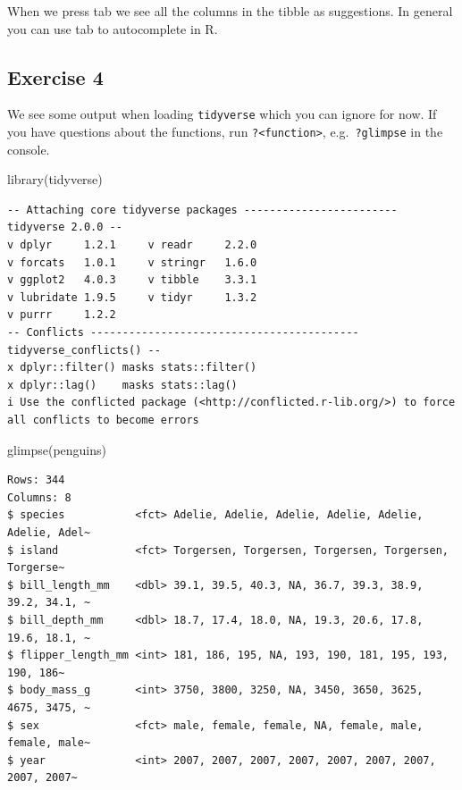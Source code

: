 \documentclass[
  letterpaper,
  DIV=11,
  numbers=noendperiod]{scrreprt}
\newenvironment{Shaded}{\begin{snugshade}}{\end{snugshade}}
\newcommand{\FunctionTok}[1]{\textcolor[rgb]{0.28,0.35,0.67}{#1}}
\newcommand{\NormalTok}[1]{\textcolor[rgb]{0.00,0.23,0.31}{#1}}
\begin{document}
When we press tab we see all the columns in the tibble as suggestions.
In general you can use tab to autocomplete in R.

\subsection{Exercise 4}\label{exercise-4-1}

We see some output when loading \texttt{tidyverse} which you can ignore
for now. If you have questions about the functions, run
\texttt{?\textless{}function\textgreater{}}, e.g.~\texttt{?glimpse} in
the console.

\begin{Shaded}
\begin{Highlighting}[]
\FunctionTok{library}\NormalTok{(tidyverse)}
\end{Highlighting}
\end{Shaded}

\begin{verbatim}
-- Attaching core tidyverse packages ------------------------ tidyverse 2.0.0 --
v dplyr     1.2.1     v readr     2.2.0
v forcats   1.0.1     v stringr   1.6.0
v ggplot2   4.0.3     v tibble    3.3.1
v lubridate 1.9.5     v tidyr     1.3.2
v purrr     1.2.2     
-- Conflicts ------------------------------------------ tidyverse_conflicts() --
x dplyr::filter() masks stats::filter()
x dplyr::lag()    masks stats::lag()
i Use the conflicted package (<http://conflicted.r-lib.org/>) to force all conflicts to become errors
\end{verbatim}

\begin{Shaded}
\begin{Highlighting}[]
\FunctionTok{glimpse}\NormalTok{(penguins)}
\end{Highlighting}
\end{Shaded}

\begin{verbatim}
Rows: 344
Columns: 8
$ species           <fct> Adelie, Adelie, Adelie, Adelie, Adelie, Adelie, Adel~
$ island            <fct> Torgersen, Torgersen, Torgersen, Torgersen, Torgerse~
$ bill_length_mm    <dbl> 39.1, 39.5, 40.3, NA, 36.7, 39.3, 38.9, 39.2, 34.1, ~
$ bill_depth_mm     <dbl> 18.7, 17.4, 18.0, NA, 19.3, 20.6, 17.8, 19.6, 18.1, ~
$ flipper_length_mm <int> 181, 186, 195, NA, 193, 190, 181, 195, 193, 190, 186~
$ body_mass_g       <int> 3750, 3800, 3250, NA, 3450, 3650, 3625, 4675, 3475, ~
$ sex               <fct> male, female, female, NA, female, male, female, male~
$ year              <int> 2007, 2007, 2007, 2007, 2007, 2007, 2007, 2007, 2007~
\end{verbatim}
\end{document}

